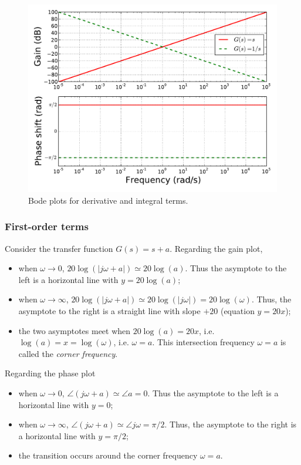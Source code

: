 \documentclass[a4paper,11pt]{report}
\theoremstyle{definition}
\begin{document}
\begin{figure}[H]
  \centering
  \includegraphics[width=12cm]{fig/bode-di.pdf}
  \caption{Bode plots for derivative and integral terms.}
  \label{fig:bode-di}
\end{figure}


\subsubsection{First-order terms}

Consider the transfer function $G(s)=s+a$. Regarding the gain plot,
\begin{itemize}
\item when $\omega\to 0$, $20\log(|j\omega+a|)\simeq
  20\log(a)$. Thus the asymptote to the left is a horizontal line
  with $y=20\log(a)$;
\item when $\omega\to\infty$, $20\log(|j\omega+a|)\simeq
  20\log(|j\omega|)=20\log(\omega)$. Thus, the asymptote to the
  right is a straight line with slope $+20$ (equation $y=20x$);
\item the two asymptotes meet when $20\log(a)=20x$,
  i.e. $\log(a)=x=\log(\omega)$, i.e. $\omega=a$. This intersection
  frequency $\omega=a$ is called the \emph{corner frequency}.
\end{itemize}

Regarding the phase plot
\begin{itemize}
\item when $\omega\to 0$, $\angle(j\omega+a) \simeq \angle a =
  0$. Thus the asymptote to the left is a horizontal line with $y=0$;
\item when $\omega\to\infty$, $\angle(j\omega+a) \simeq \angle j\omega
  = \pi/2$. Thus, the asymptote to the right is a horizontal line with
  $y=\pi/2$;
\item the transition occurs around the corner frequency $\omega=a$.
\end{itemize}
\end{document}
